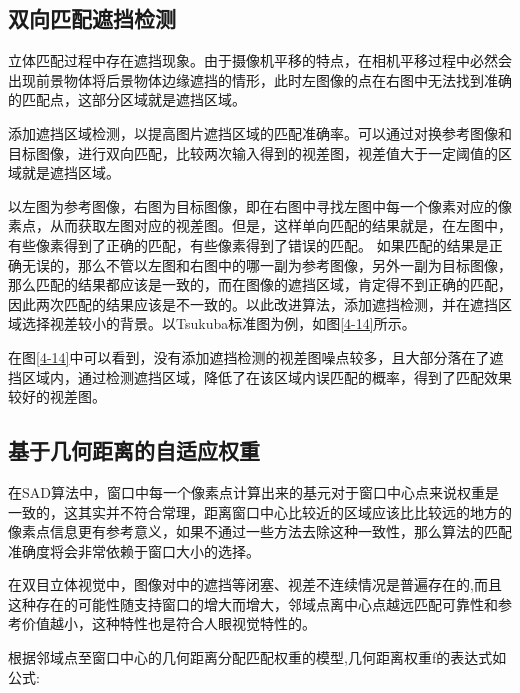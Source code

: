 \subsection{双向匹配遮挡检测}

立体匹配过程中存在遮挡现象。由于摄像机平移的特点，在相机平移过程中必然会出现前景物体将后景物体边缘遮挡的情形，此时左图像的点在右图中无法找到准确的匹配点，这部分区域就是遮挡区域。


添加遮挡区域检测，以提高图片遮挡区域的匹配准确率。可以通过对换参考图像和目标图像，进行双向匹配，比较两次输入得到的视差图，视差值大于一定阈值的区域就是遮挡区域。

以左图为参考图像，右图为目标图像，即在右图中寻找左图中每一个像素对应的像素点，从而获取左图对应的视差图。但是，这样单向匹配的结果就是，在左图中，有些像素得到了正确的匹配，有些像素得到了错误的匹配。 如果匹配的结果是正确无误的，那么不管以左图和右图中的哪一副为参考图像，另外一副为目标图像，那么匹配的结果都应该是一致的，而在图像的遮挡区域，肯定得不到正确的匹配，因此两次匹配的结果应该是不一致的。以此改进算法，添加遮挡检测，并在遮挡区域选择视差较小的背景。以Tsukuba标准图为例，如图\ref{4-14}所示。


在图\ref{4-14}中可以看到，没有添加遮挡检测的视差图噪点较多，且大部分落在了遮挡区域内，通过检测遮挡区域，降低了在该区域内误匹配的概率，得到了匹配效果较好的视差图。

\subsection{基于几何距离的自适应权重}

在SAD算法中，窗口中每一个像素点计算出来的基元对于窗口中心点来说权重是一致的，这其实并不符合常理，距离窗口中心比较近的区域应该比比较远的地方的像素点信息更有参考意义，如果不通过一些方法去除这种一致性，那么算法的匹配准确度将会非常依赖于窗口大小的选择。

在双目立体视觉中，图像对中的遮挡等闭塞、视差不连续情况是普遍存在的,而且这种存在的可能性随支持窗口的增大而增大，邻域点离中心点越远匹配可靠性和参考价值越小，这种特性也是符合人眼视觉特性的。


根据邻域点至窗口中心的几何距离分配匹配权重的模型,几何距离权重f的表达式如公式: 

